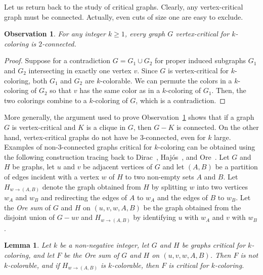 \documentclass[12pt,twoside,openright,a4paper]{book}
\newtheorem{lemma}[theorem]{Lemma}
\newtheorem{observation}[theorem]{Observation}
\begin{document}
Let us return back to the study of critical graphs.  Clearly, any vertex-critical graph must be connected.  Actually, even cuts of size one are easy to exclude.
\begin{observation}\label{obs:crit-2conn}
For any integer $k\ge 1$, every graph $G$ vertex-critical for $k$-coloring is $2$-connected.
\end{observation}
\begin{proof}
Suppose for a contradiction $G=G_1\cup G_2$ for proper induced subgraphs $G_1$ and $G_2$ intersecting in exactly one vertex $v$.
Since $G$ is vertex-critical for $k$-coloring, both $G_1$ and $G_2$ are $k$-colorable.  We can permute the colors in a $k$-coloring of $G_2$
so that $v$ has the same color as in a $k$-coloring of $G_1$.  Then, the two colorings combine to a $k$-coloring of $G$, which is a contradiction.
\end{proof}
More generally, the argument used to prove Observation~\ref{obs:crit-2conn} shows that if a graph $G$ is vertex-critical and $K$ is a clique
in $G$, then $G-K$ is connected.
On the other hand, vertex-critical graphs do not have be $3$-connected, even for $k$ large.  Examples of non-$3$-connected graphs critical for $k$-coloring can
be obtained using the following construction tracing back to Dirac~\cite{dircrit}, Haj\'os~\cite{hajos}, and Ore~\cite{ore}.  Let $G$ and $H$ be graphs,
let $u$ and $v$ be adjacent vertices of $G$ and let $(A,B)$ be a partition of edges incident with a vertex $w$ of $H$ to two non-empty sets $A$ and $B$.
Let $H_{w\to(A,B)}$ denote the graph obtained from $H$ by splitting $w$ into two vertices $w_A$ and $w_B$ and redirecting the edges of $A$ to $w_A$
and the edges of $B$ to $w_B$.  Let the \emph{Ore sum} of $G$ and $H$ on $(u,v,w,A,B)$ be the graph obtained from the disjoint union
of $G-uv$ and $H_{w\to(A,B)}$ by identifying $u$ with $w_A$ and $v$ with $w_B$.
\begin{lemma}\label{lemma:orecrit}
Let $k$ be a non-negative integer, let $G$ and $H$ be graphs critical for $k$-coloring, and let $F$ be the Ore sum of $G$ and $H$ on $(u,v,w,A,B)$.
Then $F$ is not $k$-colorable, and if $H_{w\to(A,B)}$ is $k$-colorable, then $F$ is critical for $k$-coloring.
\end{lemma}
\end{document}
